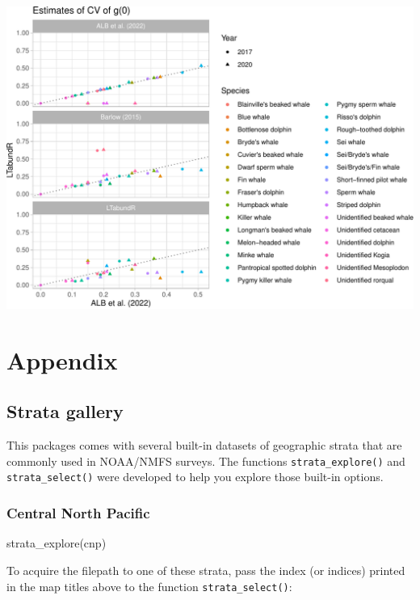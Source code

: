 \documentclass[
]{book}
\newenvironment{Shaded}{\begin{snugshade}}{\end{snugshade}}
\newcommand{\FunctionTok}[1]{\textcolor[rgb]{0.00,0.00,0.00}{#1}}
\newcommand{\NormalTok}[1]{#1}
\newcommand{\StringTok}[1]{\textcolor[rgb]{0.31,0.60,0.02}{#1}}
\begin{document}
\includegraphics{figures/unnamed-chunk-389-1.pdf}

\hypertarget{part-appendix}{%
\part{Appendix}\label{part-appendix}}

\hypertarget{stratagallery}{%
\chapter{Strata gallery}\label{stratagallery}}

This packages comes with several built-in datasets of geographic strata that are commonly used in NOAA/NMFS surveys. The functions \texttt{strata\_explore()} and \texttt{strata\_select()} were developed to help you explore those built-in options.

\hypertarget{central-north-pacific}{%
\section*{Central North Pacific}\label{central-north-pacific}}

\begin{Shaded}
\begin{Highlighting}[]
\FunctionTok{strata\_explore}\NormalTok{(}\StringTok{\textquotesingle{}cnp\textquotesingle{}}\NormalTok{)}
\end{Highlighting}
\end{Shaded}

To acquire the filepath to one of these strata, pass the index (or indices) printed in the map titles above to the function \texttt{strata\_select()}:
\end{document}
